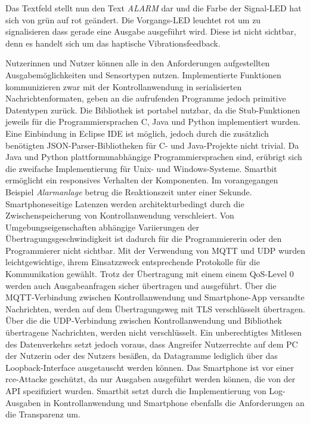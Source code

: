 \documentclass[11pt,a4paper]{report}
\begin{document}
Das Textfeld stellt nun den Text \textit{ALARM} dar und die Farbe der Signal-LED hat sich von grün auf rot geändert.
Die Vorgangs-LED leuchtet rot um zu signalisieren dass gerade eine Ausgabe ausgeführt wird.
Diese ist nicht sichtbar, denn es handelt sich um das haptische Vibrationsfeedback.

Nutzerinnen und Nutzer können alle in den Anforderungen aufgestellten Ausgabemöglichkeiten und Sensortypen nutzen.
Implementierte Funktionen kommunizieren zwar mit der Kontrollanwendung in serialisierten Nachrichtenformaten, geben an die aufrufenden Programme jedoch primitive Datentypen zurück.
Die Bibliothek ist portabel nutzbar, da die Stub-Funktionen jeweils für die Programmiersprachen C, Java und Python implementiert wurden.
Eine Einbindung in Eclipse IDE ist möglich, jedoch durch die zusätzlich benötigten JSON-Parser-Bibliotheken für C- und Java-Projekte nicht trivial.
Da Java und Python plattformunabhängige Programmiersprachen sind, erübrigt sich die zweifache Implementierung für Unix- und Windows-Systeme.
Smartbit ermöglicht ein responsives Verhalten der Komponenten.
Im vorangegangen Beispiel \textit{Alarmanlage} betrug die Reaktionszeit unter einer Sekunde.
Smartphoneseitige Latenzen werden architekturbedingt durch die Zwischenspeicherung von Kontrollanwendung verschleiert.
Von Umgebungseigenschaften abhängige Variierungen der Übertragungsgeschwindigkeit ist dadurch für die Programmiererin oder den Programmierer nicht sichtbar.
Mit der Verwendung von MQTT und UDP wurden leichtgewichtige, ihrem Einsatzzweck entsprechende Protokolle für die Kommunikation gewählt.
Trotz der Übertragung mit einem einem QoS-Level 0 werden auch Ausgabeanfragen sicher übertragen und ausgeführt.
Über die MQTT-Verbindung zwischen Kontrollanwendung und Smartphone-App versandte Nachrichten, werden auf dem Übertragungsweg mit TLS verschlüsselt übertragen.
Über die die UDP-Verbindung zwischen Kontrollanwendung und Bibliothek übertragene Nachrichten, werden nicht verschlüsselt.
Ein unberechtigtes Mitlesen des Datenverkehrs setzt jedoch voraus, dass Angreifer Nutzerrechte auf dem PC der Nutzerin oder des Nutzers besäßen, da Datagramme lediglich über das Loopback-Interface ausgetauscht werden können.
Das Smartphone ist vor einer \acrfull{rce}-Attacke geschützt, da nur Ausgaben ausgeführt werden können, die von der API spezifiziert wurden.
Smartbit setzt durch die Implementierung von Log-Ausgaben in Kontrollanwendung und Smartphone ebenfalls die Anforderungen an die Transparenz um.
\end{document}

